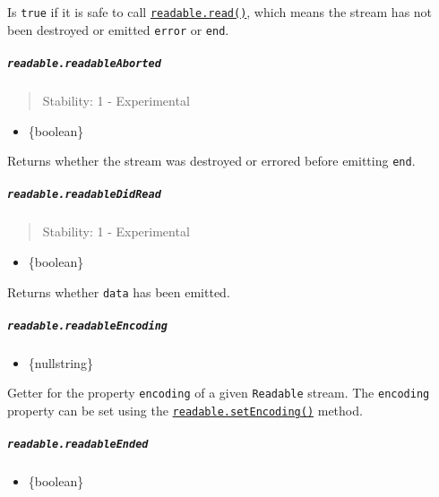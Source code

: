 Is \texttt{true} if it is safe to call
\hyperref[readablereadsize]{\texttt{readable.read()}}, which means the
stream has not been destroyed or emitted
\texttt{\textquotesingle{}error\textquotesingle{}} or
\texttt{\textquotesingle{}end\textquotesingle{}}.

\subparagraph{\texorpdfstring{\texttt{readable.readableAborted}}{readable.readableAborted}}\label{readable.readableaborted}

\begin{quote}
Stability: 1 - Experimental
\end{quote}

\begin{itemize}
\tightlist
\item
  \{boolean\}
\end{itemize}

Returns whether the stream was destroyed or errored before emitting
\texttt{\textquotesingle{}end\textquotesingle{}}.

\subparagraph{\texorpdfstring{\texttt{readable.readableDidRead}}{readable.readableDidRead}}\label{readable.readabledidread}

\begin{quote}
Stability: 1 - Experimental
\end{quote}

\begin{itemize}
\tightlist
\item
  \{boolean\}
\end{itemize}

Returns whether \texttt{\textquotesingle{}data\textquotesingle{}} has
been emitted.

\subparagraph{\texorpdfstring{\texttt{readable.readableEncoding}}{readable.readableEncoding}}\label{readable.readableencoding}

\begin{itemize}
\tightlist
\item
  \{null\textbar string\}
\end{itemize}

Getter for the property \texttt{encoding} of a given \texttt{Readable}
stream. The \texttt{encoding} property can be set using the
\hyperref[readablesetencodingencoding]{\texttt{readable.setEncoding()}}
method.

\subparagraph{\texorpdfstring{\texttt{readable.readableEnded}}{readable.readableEnded}}\label{readable.readableended}

\begin{itemize}
\tightlist
\item
  \{boolean\}
\end{itemize}

